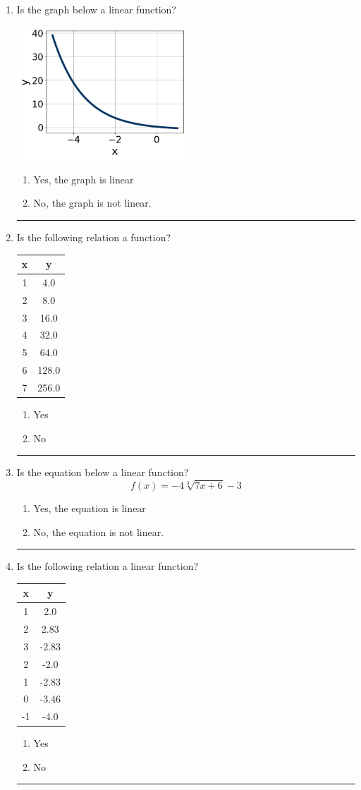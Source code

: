 \documentclass[14pt]{extbook}
\newcommand{\litem}[1]{\item#1\hspace*{-1cm}\rule{\textwidth}{0.4pt}}
\begin{document}
\begin{enumerate}
{\begin{enumerate}[label=\Alph*.]
\end{enumerate} }
\litem{
Is the graph below a linear function?
\begin{center}
    \includegraphics[width=0.5\textwidth]{../Figures/MA_8_F_1_2_graphT.png}
\end{center}
\begin{enumerate}[label=\Alph*.]
\item Yes, the graph is linear
\item No, the graph is not linear.

\end{enumerate} }
\litem{
Is the following relation a function?

\begin{tabular}{c|c}
x &y\tabularnewline \hline
1 &4.0\tabularnewline \hline
2 &8.0\tabularnewline \hline
3 &16.0\tabularnewline \hline
4 &32.0\tabularnewline \hline
5 &64.0\tabularnewline \hline
6 &128.0\tabularnewline \hline
7 &256.0\end{tabular}\begin{enumerate}[label=\Alph*.]
\item Yes
\item No

\end{enumerate} }
\litem{
Is the equation below a linear function?\[ f(x) = {-4}\sqrt[3]{7x + 6}-3 \]\begin{enumerate}[label=\Alph*.]
\item Yes, the equation is linear
\item No, the equation is not linear.

\end{enumerate} }
\litem{
Is the following relation a linear function?

\begin{tabular}{c|c}
x &y\tabularnewline \hline
1 &2.0\tabularnewline \hline
2 &2.83\tabularnewline \hline
3 &-2.83\tabularnewline \hline
2 &-2.0\tabularnewline \hline
1 &-2.83\tabularnewline \hline
0 &-3.46\tabularnewline \hline
-1 &-4.0\end{tabular}\begin{enumerate}[label=\Alph*.]
\item Yes
\item No


\end{enumerate}}
\end{enumerate}
\end{document}
